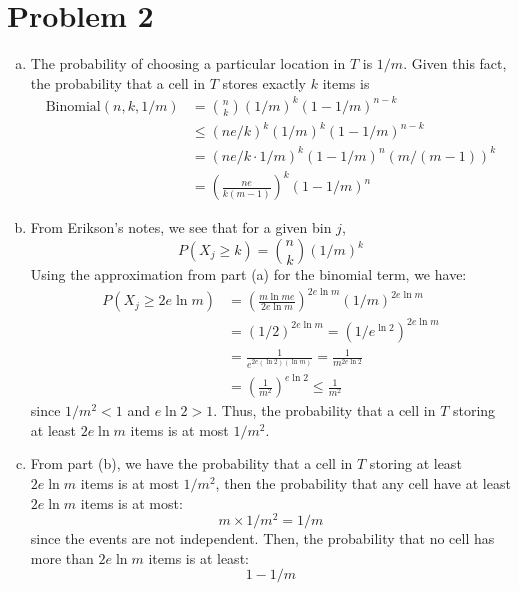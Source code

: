 \documentclass{article}
\begin{document}
\section*{Problem 2}
\begin{enumerate}[(a)]
\item The probability of choosing a particular location in $T$ is $1/m$. Given this fact, the probability that a cell in $T$ stores exactly $k$ items is 
\begin{align*}
\text{Binomial}(n,k,1/m) &= \binom{n}{k}(1/m)^k (1-1/m)^{n-k} \\
&\leq (ne/k)^k (1/m)^k (1-1/m)^{n-k} \\
&=(ne/k \cdot 1/m)^k (1-1/m)^n (m/(m-1))^k \\
&=\left(\frac{ne}{k(m-1)} \right)^k (1-1/m)^n
\end{align*}


\item From Erikson's notes, we see that for a given bin $j$,
$$P(X_j \geq k) = \binom{n}{k}(1/m)^k$$
Using the approximation from part (a) for the binomial term, we have:
\begin{align*}
P(X_j \geq 2e\ln m) &= \left(\frac{m\ln m e}{2e\ln m}  \right)^{2e\ln m} (1/m)^{2e\ln m}\\
&=(1/2)^{2e\ln m} = (1/e^{\ln 2})^{2e\ln m} \\
&=\frac{1}{e^{2e(\ln 2)(\ln m)}} = \frac{1}{m^{2e \ln 2}} \\
& = \left(\frac{1}{m^2}\right)^{e\ln 2} \leq \frac{1}{m^2}
\end{align*}
since $1/m^2<1$ and $e\ln 2>1$. Thus, the probability that a cell in $T$ storing at least $2e\ln m$ items is at most $1/m^2$.

\item From part (b), we have the probability that a cell in $T$ storing at least $2e\ln m$ items is at most $1/m^2$, then the probability that any cell have at least $2e\ln m$ items is at most:
$$m\times 1/m^2 = 1/m$$
since the events are not independent. Then, the probability that no cell has more than $2e \ln m$ items is at least:
$$1-1/m$$
\end{enumerate}

\pagebreak
\end{document}
